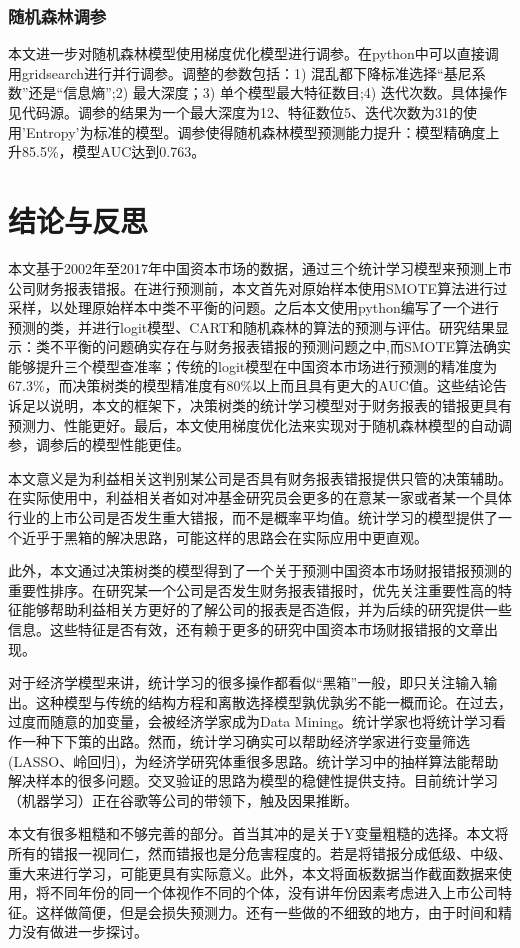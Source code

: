 \documentclass{article}
\begin{document}
\subsubsection{随机森林调参}
\label{par:梯度优化调参}
本文进一步对随机森林模型使用梯度优化模型进行调参。在python中可以直接调用gridsearch进行并行调参。调整的参数包括：1) 混乱都下降标准选择“基尼系数”还是“信息熵”;2) 最大深度；3) 单个模型最大特征数目;4) 迭代次数。具体操作见代码源。调参的结果为一个最大深度为12、特征数位5、迭代次数为31的使用'Entropy'为标准的模型。调参使得随机森林模型预测能力提升：模型精确度上升85.5\%，模型AUC达到0.763。

\section{结论与反思}
\par 本文基于2002年至2017年中国资本市场的数据，通过三个统计学习模型来预测上市公司财务报表错报。在进行预测前，本文首先对原始样本使用SMOTE算法进行过采样，以处理原始样本中类不平衡的问题。之后本文使用python编写了一个进行预测的类，并进行logit模型、CART和随机森林的算法的预测与评估。研究结果显示：类不平衡的问题确实存在与财务报表错报的预测问题之中,而SMOTE算法确实能够提升三个模型查准率；传统的logit模型在中国资本市场进行预测的精准度为67.3\%，而决策树类的模型精准度有80\%以上而且具有更大的AUC值。这些结论告诉足以说明，本文的框架下，决策树类的统计学习模型对于财务报表的错报更具有预测力、性能更好。最后，本文使用梯度优化法来实现对于随机森林模型的自动调参，调参后的模型性能更佳。
\par 本文意义是为利益相关这判别某公司是否具有财务报表错报提供只管的决策辅助。在实际使用中，利益相关者如对冲基金研究员会更多的在意某一家或者某一个具体行业的上市公司是否发生重大错报，而不是概率平均值。统计学习的模型提供了一个近乎于黑箱的解决思路，可能这样的思路会在实际应用中更直观。
\par 此外，本文通过决策树类的模型得到了一个关于预测中国资本市场财报错报预测的重要性排序。在研究某一个公司是否发生财务报表错报时，优先关注重要性高的特征能够帮助利益相关方更好的了解公司的报表是否造假，并为后续的研究提供一些信息。这些特征是否有效，还有赖于更多的研究中国资本市场财报错报的文章出现。
\par 对于经济学模型来讲，统计学习的很多操作都看似“黑箱”一般，即只关注输入输出。这种模型与传统的结构方程和离散选择模型孰优孰劣不能一概而论。在过去，过度而随意的加变量，会被经济学家成为Data Mining。统计学家也将统计学习看作一种下下策的出路。然而，统计学习确实可以帮助经济学家进行变量筛选(LASSO、岭回归)，为经济学研究体重很多思路。统计学习中的抽样算法能帮助解决样本的很多问题。交叉验证的思路为模型的稳健性提供支持。目前统计学习（机器学习）正在谷歌等公司的带领下，触及因果推断。
\par 本文有很多粗糙和不够完善的部分。首当其冲的是关于Y变量粗糙的选择。本文将所有的错报一视同仁，然而错报也是分危害程度的。若是将错报分成低级、中级、重大来进行学习，可能更具有实际意义。此外，本文将面板数据当作截面数据来使用，将不同年份的同一个体视作不同的个体，没有讲年份因素考虑进入上市公司特征。这样做简便，但是会损失预测力。还有一些做的不细致的地方，由于时间和精力没有做进一步探讨。
\end{document}
